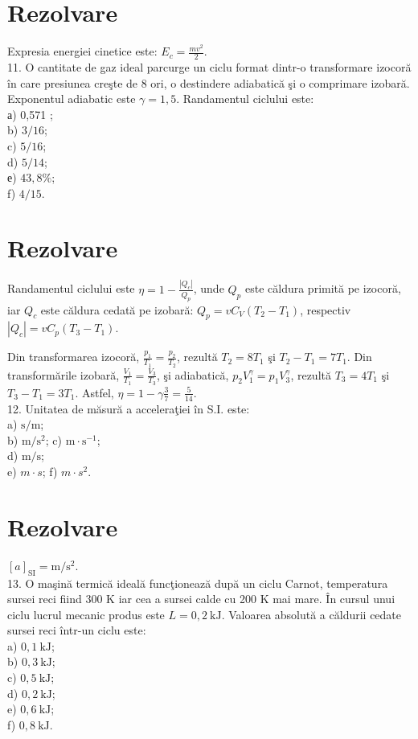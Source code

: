 \section*{Rezolvare}
Expresia energiei cinetice este: $E_{c}=\frac{m v^{2}}{2}$.\\
11. O cantitate de gaz ideal parcurge un ciclu format dintr-o transformare izocoră în care presiunea creşte de 8 ori, o destindere adiabatică şi o comprimare izobară. Exponentul adiabatic este $\gamma=1,5$. Randamentul ciclului este:\\
а) 0,571 ;\\
b) $3 / 16$;\\
c) $5 / 16$;\\
d) $5 / 14$;\\
е) $43,8 \%$;\\
f) $4 / 15$.

\section*{Rezolvare}
Randamentul ciclului este $\eta=1-\frac{\left|Q_{c}\right|}{Q_{p}}$, unde $Q_{p}$ este căldura primită pe izocoră, iar $Q_{c}$ este căldura cedată pe izobară: $Q_{p}=v C_{V}\left(T_{2}-T_{1}\right)$, respectiv $\left|Q_{c}\right|=v C_{p}\left(T_{3}-T_{1}\right)$.

Din transformarea izocoră, $\frac{p_{1}}{T_{1}}=\frac{p_{2}}{T_{2}}$, rezultă $T_{2}=8 T_{1}$ şi $T_{2}-T_{1}=7 T_{1}$. Din transformările izobară, $\frac{V_{1}}{T_{1}}=\frac{V_{3}}{T_{3}}$, şi adiabatică, $p_{2} V_{1}^{\gamma}=p_{1} V_{3}^{\gamma}$, rezultă $T_{3}=4 T_{1}$ şi $T_{3}-T_{1}=3 T_{1}$. Astfel, $\eta=1-\gamma \frac{3}{7}=\frac{5}{14}$.\\
12. Unitatea de măsură a acceleraţiei în S.I. este:\\
a) $\mathrm{s} / \mathrm{m}$;\\
b) $\mathrm{m} / \mathrm{s}^{2}$; c) $\mathrm{m} \cdot \mathrm{s}^{-1}$;\\
d) $\mathrm{m} / \mathrm{s}$;\\
e) $m \cdot s$; f) $m \cdot s^{2}$.

\section*{Rezolvare}
$[a]_{\mathrm{SI}}=\mathrm{m} / \mathrm{s}^{2}$.\\
13. O maşină termică ideală funcţionează după un ciclu Carnot, temperatura sursei reci fiind 300 K iar cea a sursei calde cu 200 K mai mare. În cursul unui ciclu lucrul mecanic produs este $L=0,2 \mathrm{~kJ}$. Valoarea absolută a căldurii cedate sursei reci într-un ciclu este:\\
a) $0,1 \mathrm{~kJ}$;\\
b) $0,3 \mathrm{~kJ}$;\\
c) $0,5 \mathrm{~kJ}$;\\
d) $0,2 \mathrm{~kJ}$;\\
e) $0,6 \mathrm{~kJ}$;\\
f) $0,8 \mathrm{~kJ}$.

